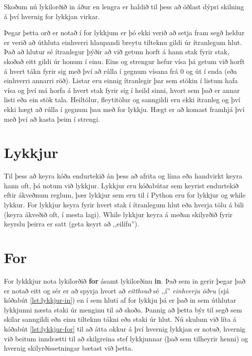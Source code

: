 {Skoðum nú lykilorðið in áður en lengra er haldið til þess að öðlast dýpri skilning á því hvernig for lykkjan virkar.



Þegar þetta orð er notað í for lykkjum er þó ekki verið að setja fram segð heldur er verið að úthluta einhverri hlaupandi breytu tilteknu gildi úr ítranlegum hlut.
Það að hlutur sé ítranlegur þýðir að við getum horft á hann stak fyrir stak, skoðað eitt gildi úr honum í einu.
Eins og strengur hefur vísa þá getum við horft á hvert tákn fyrir sig með því að rúlla í gegnum vísana frá 0 og út í enda (eða einhverri annarri röð).
Listar eru einnig ítranlegir þar sem stökin í listum hafa vísa og því má horfa á hvert stak fyrir sig í heild sinni, hvort sem það er annar listi eða ein stök tala.
Heiltölur, fleytitölur og sanngildi eru ekki ítranleg og því ekki hægt að rúlla í gegnum þau með for lykkju.
Hægt er að komast framhjá því með því að kasta þeim í strengi.




\section{Lykkjur}
Til þess að keyra kóða endurtekið án þess að afrita og líma eða handvirkt keyra hann oft, þá notum við lykkjur.
Lykkjur eru kóðabútar sem keyrist endurtekið eftir ákveðnum reglum, þær lykkjur sem eru til í Python eru for lykkjur og while lykkur.
For lykkjur keyra fyrir hvert stak í ítranlegum hlut eða hverja tölu á bili (keyra ákveðið oft, í mesta lagi).
While lykkjur keyra á meðan skilyrðið fyrir keyrslu þeirra er satt (geta keyrt að ,,eilífu'').

}

\section{For}
For lykkkjur nota lykilorðið \textbf{for} ásamt lykilorðinu \textbf{in}.
Það sem in gerir þegar það er notað eitt og sér er að spyrja hvort að \textit{eitthvað} sé ,,í'' \textit{einhverju öðru} (sjá kóðabút \ref{lst:lykkjur-in}) en í sem hluti af for lykkju þá er það in sem úthlutar lykkjunni næsta staki úr menginu til að skoða.
Þannig að þetta býr til segð sem skilar sanngildi eða einu tilteknu tákni eða staki úr hlut.
Nú skulum við líta á kóðabút \ref{lst:lykkjur-for} til að átta okkur á því hvernig lykkjan er notuð, hvernig við beitum inndrætti til að skilgreina stef lykkjunnar (það sem tilheyrir henni) og hvernig skilyrðissetningar bætast við þetta.

